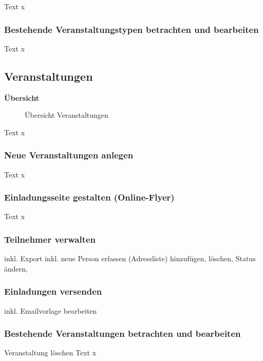 Text x

\subsubsection{Bestehende Veranstaltungstypen betrachten und bearbeiten}

Text x

\vspace{\baselineskip}

\subsection{Veranstaltungen}

\textbf{Übersicht}

\begin{figure}[H]
\caption{Übersicht Veranstaltungen}
\end{figure}

Text x

\subsubsection{Neue Veranstaltungen anlegen}

Text x

\subsubsection{Einladungsseite gestalten (Online-Flyer)}

Text x

\subsubsection{Teilnehmer verwalten}

inkl. Export
inkl. neue Person erfassen (Adressliste)
hinzufügen, löschen, Status ändern, 


\subsubsection{Einladungen versenden}

inkl. Emailvorlage bearbeiten

\subsubsection{Bestehende Veranstaltungen betrachten und bearbeiten}

Veranstaltung löschen
Text x

